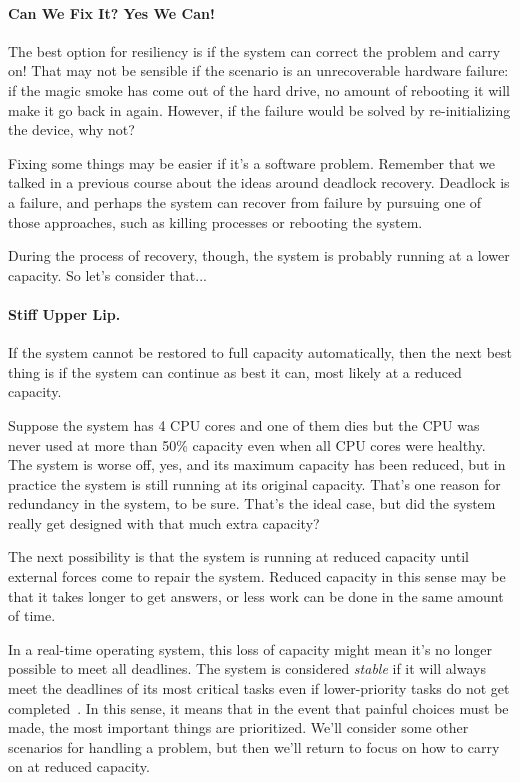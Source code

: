 \paragraph{Can We Fix It? Yes We Can!} The best option for resiliency is if the system can correct the problem and carry on! That may not be sensible if the scenario is an unrecoverable hardware failure: if the magic smoke has come out of the hard drive, no amount of rebooting it will make it go back in again. However, if the failure would be solved by re-initializing the device, why not?

Fixing some things may be easier if it's a software problem. Remember that we talked in a previous course about the ideas around deadlock recovery. Deadlock is a failure, and perhaps the system can recover from failure by pursuing one of those approaches, such as killing processes or rebooting the system.

During the process of recovery, though, the system is probably running at a lower capacity. So let's consider that...

\paragraph{Stiff Upper Lip.} If the system cannot be restored to full capacity automatically, then the next best thing is if the system can continue as best it can, most likely at a reduced capacity. 

Suppose the system has 4 CPU cores and one of them dies but the CPU was never used at more than 50\% capacity even when all CPU cores were healthy. The system is worse off, yes, and its maximum capacity has been reduced, but in practice the system is still running at its original capacity. That's one reason for redundancy in the system, to be sure. That's the ideal case, but did the system really get designed with that much extra capacity?

The next possibility is that the system is running at reduced capacity until external forces come to repair the system. Reduced capacity in this sense may be that it takes longer to get answers, or less work can be done in the same amount of time. 

In a real-time operating system, this loss of capacity might mean it's no longer possible to meet all deadlines. The system is considered \textit{stable} if it will always meet the deadlines of its most critical tasks even if lower-priority tasks do not get completed~\cite{osi}. In this sense, it means that in the event that painful choices must be made, the most important things are prioritized. We'll consider some other scenarios for handling a problem, but then we'll return to focus on how to carry on at reduced capacity.

